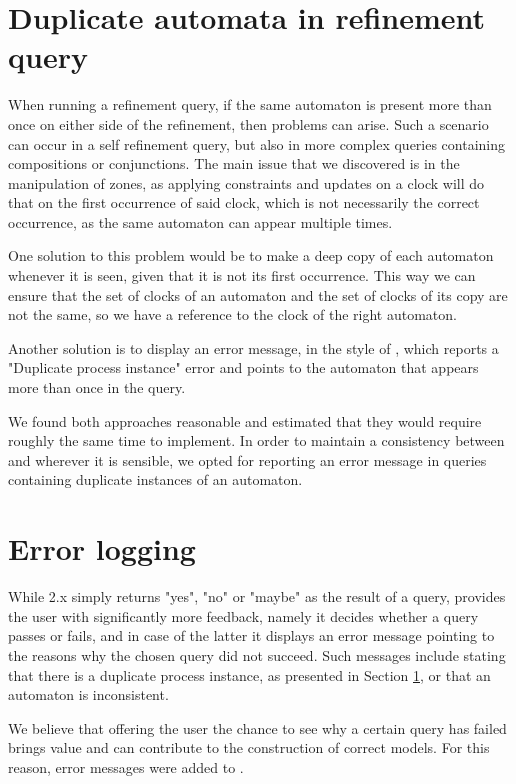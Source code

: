 \section{Duplicate automata in refinement query} \label{sec:dupProc}

When running a refinement query, if the same automaton is present more than once on either side of the refinement, then problems can arise. Such a scenario can occur in a self refinement query, but also in more complex queries containing compositions or conjunctions. The main issue that we discovered is in the manipulation of zones, as applying constraints and updates on a clock will do that on the first occurrence of said clock, which is not necessarily the correct occurrence, as the same automaton can appear multiple times.

One solution to this problem would be to make a deep copy of each automaton whenever it is seen, given that it is not its first occurrence. This way we can ensure that the set of clocks of an automaton and the set of clocks of its copy are not the same, so we have a reference to the clock of the right automaton.

Another solution is to display an error message, in the style of , which reports a "Duplicate process instance" error and points to the automaton that appears more than once in the query.

We found both approaches reasonable and estimated that they would require roughly the same time to implement. In order to maintain a consistency between \jecdar and \ecdar wherever it is sensible, we opted for reporting an error message in queries containing duplicate instances of an automaton.

\section{Error logging}

While \ecdar 2.x simply returns "yes", "no" or "maybe" as the result of a query,  provides the user with significantly more feedback, namely it decides whether a query passes or fails, and in case of the latter it displays an error message pointing to the reasons why the chosen query did not succeed. Such messages include stating that there is a duplicate process instance, as presented in Section \ref{sec:dupProc}, or that an automaton is inconsistent.

We believe that offering the user the chance to see why a certain query has failed brings value and can contribute to the construction of correct models. For this reason, error messages were added to \jecdar.

